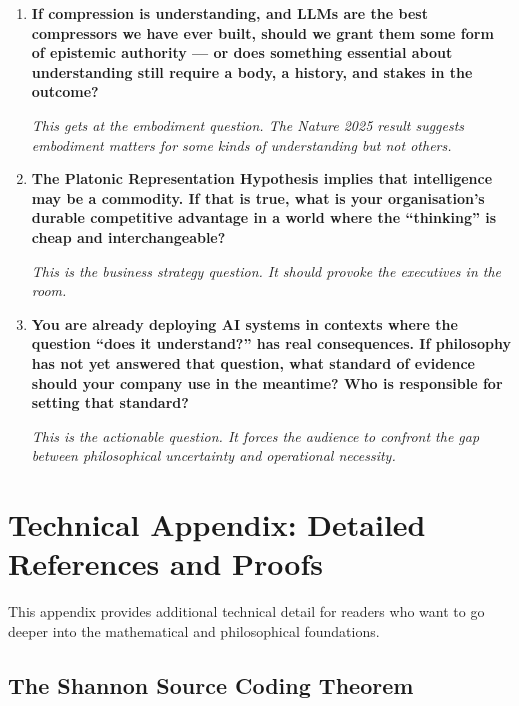 \documentclass[11pt, a4paper]{article}
\begin{document}
\begin{enumerate}[leftmargin=2em]
  \item \textbf{If compression is understanding, and LLMs are the best
    compressors we have ever built, should we grant them some form of
    epistemic authority --- or does something essential about
    understanding still require a body, a history, and stakes in the
    outcome?}

    \emph{This gets at the embodiment question. The Nature 2025 result
    suggests embodiment matters for some kinds of understanding but not
    others.}

  \item \textbf{The Platonic Representation Hypothesis implies that
    intelligence may be a commodity. If that is true, what is your
    organisation's durable competitive advantage in a world where the
    ``thinking'' is cheap and interchangeable?}

    \emph{This is the business strategy question. It should provoke the
    executives in the room.}

  \item \textbf{You are already deploying AI systems in contexts where
    the question ``does it understand?'' has real consequences. If
    philosophy has not yet answered that question, what standard of
    evidence should your company use in the meantime? Who is responsible
    for setting that standard?}

    \emph{This is the actionable question. It forces the audience to
    confront the gap between philosophical uncertainty and operational
    necessity.}
\end{enumerate}


\section{Technical Appendix: Detailed References and Proofs}

This appendix provides additional technical detail for readers who want
to go deeper into the mathematical and philosophical foundations.

\subsection{The Shannon Source Coding Theorem}
\end{document}
